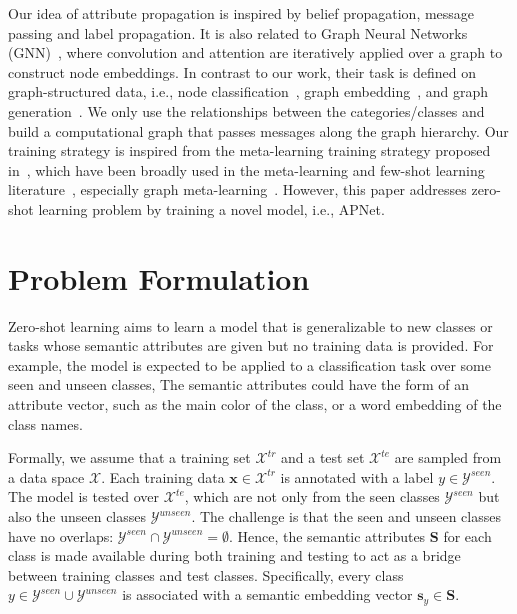 \documentclass[letterpaper]{article} %
\def\vs{{\bm{s}}}
\def\vx{{\bm{x}}}
\def\mS{{\bm{S}}}
\begin{document}
Our idea of attribute propagation is inspired by belief propagation, message passing and label propagation.
It is also related to Graph Neural Networks (GNN)~\cite{henaff2015deep,wu2019comprehensive}, where convolution and attention are iteratively applied over a graph to construct node embeddings. 
In contrast to our work, their task is defined on graph-structured data, i.e., node classification~\cite{hamilton2017inductive}, graph embedding~\cite{pan2018adversarially}, and graph generation~\cite{dai2018syntax}. We only use the relationships between the categories/classes and build a computational graph that passes messages along the graph hierarchy. Our training strategy is inspired from the meta-learning training strategy proposed in~\cite{santoro2016meta}, which have been broadly used in the meta-learning and few-shot learning literature~\cite{finn2017model,snell2017prototypical,dong2019search}, especially graph meta-learning~\cite{liu2019ppn,liu2019GPN}. However, this paper addresses zero-shot learning problem by training a novel model, i.e.,  APNet.


\section{Problem Formulation}
Zero-shot learning aims to learn a model that is generalizable to new classes or tasks whose semantic attributes are given but no training data is provided. For example, the model is expected to be applied to a classification task over some seen and unseen classes, 
The semantic attributes could have the form of an attribute vector, such as the main color of the class, or a word embedding  of the class names.

Formally, we assume that a training set $\mathcal{X}^{tr}$ and a test set $\mathcal{X}^{te}$ are sampled from a data space $\mathcal X$. Each training data $\vx \in \mathcal{X}^{tr}$
is annotated with a label $y \in \mathcal{Y}^{seen}$. 
The model is tested over $\mathcal{X}^{te}$, which are not only from the seen classes $\mathcal{Y}^{seen}$ but also the unseen classes $\mathcal{Y}^{unseen}$.
The challenge is that the seen and unseen classes have no overlaps: $\mathcal{Y}^{seen} \cap \mathcal{Y}^{unseen} = \emptyset$.
Hence, the semantic attributes $\mS$ for each class is made available during both training and testing to act as a bridge between training classes and test classes. Specifically, every class $y \in \mathcal{Y}^{seen} \cup \mathcal{Y}^{unseen} $ is associated with a semantic embedding vector $\vs_y \in \mS$.
\end{document}
